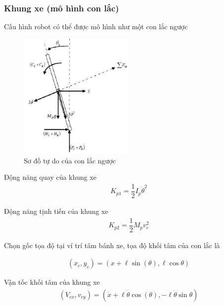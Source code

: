     \subsubsection*{Khung xe (mô hình con lắc)}
        \hspace*{0.6cm}Cấu hình robot có thể được mô hình như một con lắc ngược
            \begin{figure}[H]
                \centering
                \includegraphics[width=0.5\textwidth]{pictures/inverted_pendulum.png} 
                \caption{Sơ đồ tự do của con lắc ngược}
            \end{figure}
            
            Động năng quay của khung xe
            \begin{align}
                K_{p1} = \dfrac{1}{2} I_p \dot{\theta}^2 
            \end{align}
            
            Động năng tịnh tiến của khung xe
            \begin{align}
                K_{p2} = \dfrac{1}{2} M_p v_c^2
            \end{align}
            
            Chọn gốc tọa độ tại ví trí tâm bánh xe, tọa độ khối tâm của con lắc là

            \begin{align}
                (x_c, y_c) = (x+\ell \sin(\theta), \ell \cos \theta) 
            \end{align}
            
            Vận tốc khối tâm của khung xe
            \begin{align}
                (V_{cx}, v_{cy}) = (\dot{x}+\ell \dot{\theta} \cos(\theta), -\ell \dot{\theta}\sin \theta) 
            \end{align}

